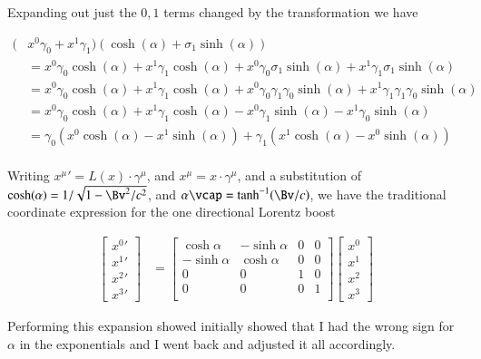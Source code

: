 \documentclass{article}
\begin{document}
Expanding out just the $0,1$ terms changed by the transformation we have

\begin{align*}
(
&x^0 \gamma_0
+x^1 \gamma_1
)
(\cosh(\alpha) + \sigma_1 \sinh(\alpha)) \\
&=
x^0 \gamma_0 \cosh(\alpha) 
+x^1 \gamma_1 \cosh(\alpha) 
+x^0 \gamma_0 \sigma_1 \sinh(\alpha)
+x^1 \gamma_1 \sigma_1 \sinh(\alpha) \\
&=
x^0 \gamma_0 \cosh(\alpha) 
+x^1 \gamma_1 \cosh(\alpha) 
+x^0 \gamma_0 \gamma_1 \gamma_0 \sinh(\alpha)
+x^1 \gamma_1 \gamma_1 \gamma_0 \sinh(\alpha) \\
&=
x^0 \gamma_0 \cosh(\alpha) 
+x^1 \gamma_1 \cosh(\alpha) 
-x^0 \gamma_1 \sinh(\alpha)
-x^1 \gamma_0 \sinh(\alpha) \\
&=
\gamma_0 (x^0 \cosh(\alpha) -x^1 \sinh(\alpha) )
+\gamma_1 (x^1 \cosh(\alpha) -x^0 \sinh(\alpha) )
\\
\end{align*}

Writing ${x^\mu}' = L(x) \cdot \gamma^\mu$, and $x^\mu = x \cdot \gamma^\mu$,
and a substitution of $\cosh(\alpha) = 1/\sqrt{1 - \Bv^2/c^2}$, and $\alpha \vcap = \tanh^{-1}(\Bv/c)$,
we have the traditional coordinate
expression for the one directional Lorentz boost

\begin{align}
\begin{bmatrix}
{x^0}' \\
{x^1}' \\
{x^2}' \\
{x^3}'
\end{bmatrix}
&=
\begin{bmatrix}
\cosh\alpha & -\sinh\alpha & 0 & 0 \\
-\sinh\alpha & \cosh\alpha & 0 & 0 \\
0 & 0 & 1 & 0 \\
0 & 0 & 0 & 1 \\
\end{bmatrix}
\begin{bmatrix}
x^0 \\
x^1 \\
x^2 \\
x^3
\end{bmatrix}
\end{align}

Performing this expansion showed initially showed that I had the wrong sign for $\alpha$ in the exponentials and I went back and
adjusted it all accordingly.
\end{document}
